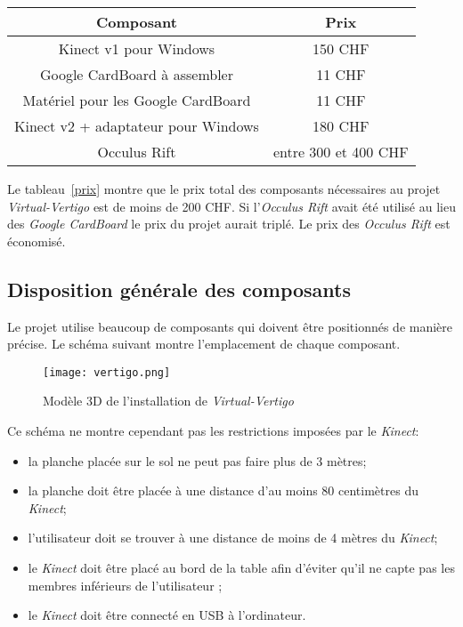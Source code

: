 \begin{center}
	\begin{tabular}{| c | c |}
	\hline
		\textbf{Composant} & \textbf{Prix} \\ \hline
		Kinect v1 pour Windows & 150 CHF \\ \hline
		Google CardBoard à assembler & 11 CHF \\ \hline
		Matériel pour les Google CardBoard & 11 CHF \\ \hline
		Kinect v2 + adaptateur pour Windows & 180 CHF \\ \hline
		Occulus Rift & entre 300 et 400 CHF\\ \hline
	\end{tabular} 
\end{center}

Le tableau~\ref{prix} montre que le prix total des composants nécessaires au projet \textit{Virtual-Vertigo} est de moins de 200 CHF. Si l'\textit{Occulus Rift} avait été utilisé au lieu des \textit{Google CardBoard} le prix du projet aurait triplé. Le prix des \textit{Occulus Rift} est économisé. 

\subsection*{Disposition générale des composants} \label{disposition}
Le projet utilise beaucoup de composants qui doivent être positionnés de manière précise. Le schéma suivant montre l'emplacement de chaque composant.

\begin{figure}[H]
	\centering
   		\texttt{[image: vertigo.png]}
   	\caption{\label{vertigo} Modèle 3D de l'installation de \textit{Virtual-Vertigo}}
\end{figure}

Ce schéma ne montre cependant pas les restrictions imposées par le \textit{Kinect}: 
\begin{itemize}
\item la planche placée sur le sol ne peut pas faire plus de 3 mètres;
\item la planche doit être placée à une distance d'au moins 80 centimètres du \textit{Kinect};
\item l'utilisateur doit se trouver à une distance de moins de 4 mètres du \textit{Kinect};
\item le \textit{Kinect} doit être placé au bord de la table afin d'éviter qu'il ne capte pas les membres inférieurs de l'utilisateur ;
\item le \textit{Kinect} doit être connecté en USB à l'ordinateur. \\

\end{itemize}


